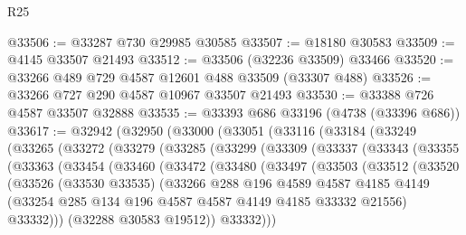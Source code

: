 \begin{lexlean}{R25}
\begin{coremodule}
@33506 := @33287 @730 @29985 @30585
@33507 := @18180 @30583
@33509 := @4145 @33507 @21493
@33512 := @33506 (@32236 @33509) @33466
@33520 := @33266 @489 @729 @4587 @12601 @488 @33509 (@33307 @488)
@33526 := @33266 @727 @290 @4587 @10967 @33507 @21493
@33530 := @33388 @726 @4587 @33507 @32888
@33535 := @33393 @686 @33196 (@4738 (@33396 @686))
@33617 := @32942
    (@32950
      (@33000
        (@33051
          (@33116
            (@33184
              (@33249
                (@33265
                  (@33272
                    (@33279
                      (@33285
                        (@33299
                          (@33309
                            (@33337
                              (@33343
                                (@33355
                                  (@33363
                                    (@33454
                                      (@33460
                                        (@33472
                                          (@33480
                                            (@33497
                                              (@33503
                                                (@33512
                                                  (@33520
                                                    (@33526
                                                      (@33530 @33535)
                                                      (@33266
                                                        @288
                                                        @196
                                                        @4589
                                                        @4587
                                                        @4185
                                                        @4149
                                                        (@33254
                                                          @285
                                                          @134
                                                          @196
                                                          @4587
                                                          @4587
                                                          @4149
                                                          @4185
                                                          @33332
                                                          @21556)
                                                        @33332)))
                                                  (@32288 @30583 @19512))
                                                @33332)))

\end{coremodule}
\end{lexlean}
